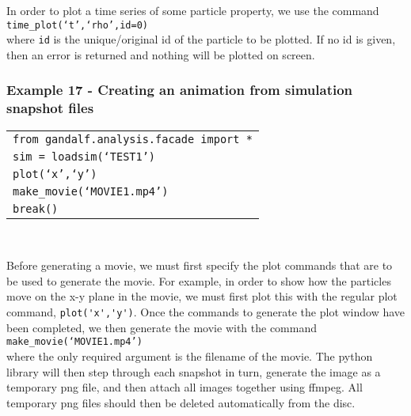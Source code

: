 \documentclass[a4paper]{article}
\newcommand{\var}[1]{\texttt{#1}}
\newcommand{\singlecommand}[1]{\\ \newline \indent \var{#1} \\ \newline \noindent}
\begin{document}




\noindent In order to plot a time series of some particle property, we use the command \singlecommand{time\_plot(`t',`rho',id=0)} where \var{id} is the unique/original id of the particle to be plotted.  If no id is given, then an error is returned and nothing will be plotted on screen.









\subsubsection{Example  17 - Creating an animation from simulation snapshot files}


\begin{tabular}{p{14.0cm}}
\var{from gandalf.analysis.facade import *} \\
\var{sim = loadsim(`TEST1')} \\
\var{plot(`x',`y')} \\
\var{make\_movie(`MOVIE1.mp4')} \\
\var{break()} \\
\end{tabular} \\
\newline
%




\noindent Before generating a movie, we must first specify the plot commands that are to be used to generate the movie.  For example, in order to show how the particles move on the x-y plane in the movie, we must first plot this with the regular plot command, \lstinline{plot('x','y')}.  Once the commands to generate the plot window have been completed, we then generate the movie with the command \singlecommand{make\_movie(`MOVIE1.mp4')} where the only required argument is the filename of the movie.  The python library will then step through each snapshot in turn, generate the image as a temporary png file, and then attach all images together using ffmpeg.  All temporary png files should then be deleted automatically from the disc.
\end{document}
